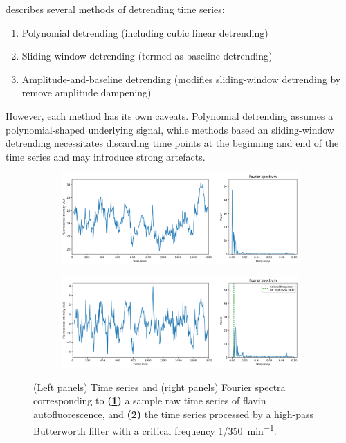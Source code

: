 \textcite{zielinskiPeriodEstimationRhythm2022} describes several methods of detrending time series:
\begin{enumerate}
  \item Polynomial detrending (including cubic linear detrending)
  \item Sliding-window detrending (termed as baseline detrending)
  \item Amplitude-and-baseline detrending (modifies sliding-window detrending by remove amplitude dampening)
\end{enumerate}

However, each method has its own caveats.
Polynomial detrending assumes a polynomial-shaped underlying signal, while methods based an sliding-window detrending necessitates discarding time points at the beginning and end of the time series and may introduce strong artefacts.

\begin{figure}
  \centering
  \begin{subfigure}[htpb]{0.8\textwidth}
   \centering
   \includegraphics[width=\textwidth]{fft_raw}
   \caption{
   }
   \label{fig:analysis-filter-raw}
  \end{subfigure}

  \begin{subfigure}[htpb]{0.8\textwidth}
   \centering
   \includegraphics[width=\textwidth]{fft_butterworth}
   \caption{
   }
   \label{fig:analysis-filter-butterworth}
  \end{subfigure}

  \caption{
    (Left panels) Time series and (right panels) Fourier spectra corresponding to
    \textbf{(\ref{fig:analysis-filter-raw})}
    a sample raw time series of flavin autofluorescence, and
    \textbf{(\ref{fig:analysis-filter-butterworth})}
    the time series processed by a high-pass Butterworth filter with a critical frequency \SI[parse-numbers=false]{1/350}{\minute^{-1}}.
  }
  \label{fig:analysis-filter}
\end{figure}

